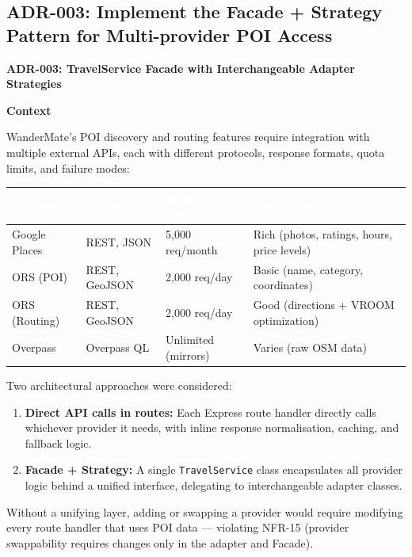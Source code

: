 \documentclass[12pt, a4paper]{article}
\newcommand{\thcell}[1]{\textcolor{white}{\textbf{\small #1}}}
\newcommand{\code}[1]{\texttt{\small #1}}
\begin{document}
\subsection{ADR-003: Implement the Facade + Strategy Pattern for Multi-provider POI Access}

\begin{tcolorbox}[adrbox]

\textbf{\large ADR-003: TravelService Facade with Interchangeable Adapter Strategies}

\vspace{0.6em}
\textbf{Context}

WanderMate's POI discovery and routing features require integration with multiple external APIs, each with different protocols, response formats, quota limits, and failure modes:

\begin{longtable}{L{2.5cm} L{3.0cm} L{2.8cm} L{2.8cm}}
\toprule
{}
\thcell{Provider} & \thcell{Protocol} & \thcell{Free-tier Quota} & \thcell{Data Quality} \\
\midrule
Google Places & REST, JSON & 5,000 req/month & Rich (photos, ratings, hours, price levels) \\
ORS (POI) & REST, GeoJSON & 2,000 req/day & Basic (name, category, coordinates) \\
ORS (Routing) & REST, GeoJSON & 2,000 req/day & Good (directions + VROOM optimization) \\
Overpass & Overpass QL & Unlimited (mirrors) & Varies (raw OSM data) \\
\bottomrule
\end{longtable}

Two architectural approaches were considered:
\begin{enumerate}
  \item \textbf{Direct API calls in routes:} Each Express route handler directly calls whichever provider it needs, with inline response normalisation, caching, and fallback logic.
  \item \textbf{Facade + Strategy:} A single \code{TravelService} class encapsulates all provider logic behind a unified interface, delegating to interchangeable adapter classes.
\end{enumerate}

Without a unifying layer, adding or swapping a provider would require modifying every route handler that uses POI data --- violating NFR-15 (provider swappability requires changes only in the adapter and Facade).


\end{tcolorbox}
\end{document}
